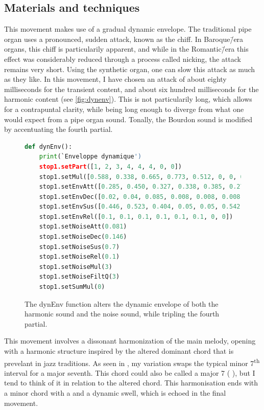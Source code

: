 \documentclass[12pt,twoside,maitrise]{dms_ks}
\theoremstyle{definition}
\begin{document}
{\subsection{Materials and techniques}

This movement makes use of a gradual dynamic envelope.
The traditional pipe organ uses a pronounced, sudden attack, known as the chiff.
In Baroque\=/era organs, this chiff is particularily apparent, and while in the Romantic\=/era this effect was considerably reduced through a process called nicking, the attack remains very short.
Using the synthetic organ, one can slow this attack as much as they like. 
In this movement, I have chosen an attack of about eighty milliseconds for the transient content, and about six hundred milliseconds for the harmonic content (see \cref{fig:dynenv}). This is not particularily long, which allows for a contrapuntal clarity, while being long enough to diverge from what one would expect from a pipe organ sound.
Tonally, the Bourdon sound is modified by accentuating the fourth partial.

\begin{figure}[H]
\begin{lstlisting}[language=Python]
def dynEnv():
    print(`Enveloppe dynamique')
    stop1.setPart([1, 2, 3, 4, 4, 4, 0, 0])
    stop1.setMul([0.588, 0.338, 0.665, 0.773, 0.512, 0, 0, 0])
    stop1.setEnvAtt([0.285, 0.450, 0.327, 0.338, 0.385, 0.277, 0, 0])
    stop1.setEnvDec([0.02, 0.04, 0.085, 0.008, 0.008, 0.008, 0, 0])
    stop1.setEnvSus([0.446, 0.523, 0.404, 0.05, 0.05, 0.542, 0, 0])
    stop1.setEnvRel([0.1, 0.1, 0.1, 0.1, 0.1, 0.1, 0, 0])
    stop1.setNoiseAtt(0.081)
    stop1.setNoiseDec(0.146)
    stop1.setNoiseSus(0.7)
    stop1.setNoiseRel(0.1)
    stop1.setNoiseMul(3)
    stop1.setNoiseFiltQ(3)
    stop1.setSumMul(0)
\end{lstlisting}
\caption{The dynEnv function alters the dynamic envelope of both the harmonic sound and the noise sound, while tripling the fourth partial.}
\label{fig:dynEnv}
\end{figure}

This movement involves a dissonant harmonization of the main melody, opening with a harmonic structure inspired by the altered dominant chord that is prevelant in jazz traditions.
As seen in , my variation swaps the typical minor 7\textsuperscript{th} interval for a major seventh.
This chord could also be called a major 7 ( ), but I tend to think of it in relation to the altered chord.
This harmonisation ends with a minor chord with a  and a dynamic swell, which is echoed in the final movement.

}
\end{document}
